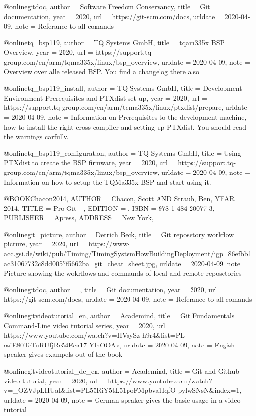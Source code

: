 
@online{gitdoc,
author = {Software Freedom Conservancy},
title = {Git documentation},
year = 2020,
url = {https://git-scm.com/docs},
urldate = {2020-04-09},
note = {Referance to all comands}
}

@online{tq_bsp119,
author = {TQ Systems GmbH},
title = {tqam335x BSP Overview},
year = 2020,
url = {https://support.tq-group.com/en/arm/tqma335x/linux/bsp_overview},
urldate = {2020-04-09},
note = {Overview over alle released BSP. You find a changelog there also}
}

@online{tq_bsp119_install,
author = {TQ Systems GmbH},
title = {Development Environment Prerequisites and PTXdist set-up},
year = 2020,
url = {https://support.tq-group.com/en/arm/tqma335x/linux/ptxdist/prepare},
urldate = {2020-04-09},
note = {Information on Prerequisites to the development machine, how to install
the right cross compiler and setting up PTXdist. You should read the warnings
carfully.}
}

@online{tq_bsp119_configuration,
author = {TQ Systems GmbH},
title = {Using PTXdist to create the BSP firmware},
year = 2020,
url = {https://support.tq-group.com/en/arm/tqma335x/linux/bsp_overview},
urldate = {2020-04-09},
note = {Information on how to setup the TQMa335x BSP and start using it.}
}

@BOOK{Chacon2014,
	AUTHOR = {Chacon, Scott AND Straub, Ben},
	YEAR = {2014},
	TITLE = {Pro Git - },
	EDITION = {},
	ISBN = {978-1-484-20077-3},
	PUBLISHER = {Apress},
	ADDRESS = {New York},
}

@online{git_picture,
author = {Detrich Beck},
title = {Git reposetory workflow picture},
year = 2020,
url =
{https://www-acc.gsi.de/wiki/pub/Timing/TimingSystemHowBuildingDeployment/igp_86efbb1ac31067732c8dd0057f5662ba_git_cheat_sheet.jpg},
urldate = {2020-04-09},
note = {Picture showing the wokrflows and commands of local and remote
    reposetories}
}

@online{gitdoc,
author = {},
title = {Git documentation},
year = 2020,
url = {https://git-scm.com/docs},
urldate = {2020-04-09},
note = {Referance to all comands}
}

@online{gitvideotutorial_en,
author = {Academind},
title = {Git Fundamentals Command-Line video tutorial series},
year = 2020,
url = {https://www.youtube.com/watch?v=HVsySz-h9r4&list=PL-osiE80TeTuRUfjRe54Eea17-YfnOOAx},
urldate = {2020-04-09},
note = {Engish speaker gives exampels out of the book \cite{Chacon2014}}
}


@online{gitvideotutorial_de_en,
author = {Academind},
title = {Git and Github video tutorial},
year = 2020,
url = {https://www.youtube.com/watch?v=_OZVJpLHUaI&list=PL55RiY5tL51poFMpbva1IqfO-pylwSNsN&index=1},
urldate = {2020-04-09},
note = {German speaker gives the basic usage in a video tutorial}
}



